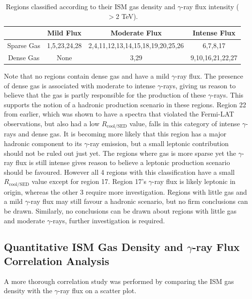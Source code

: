 \documentclass[12pt,a4paper]{article}
\begin{document}
\begin{table}[h] 
	\begin{center}
		\begin{tabular}{c|ccc}
			\toprule
			& Mild Flux  & Moderate Flux & Intense Flux \\
			\hline
			Sparse Gas &1,5,23,24,28&2,4,11,12,13,14,15,18,19,20,25,26&6,7,8,17\\
			Dense Gas & None & 3,29 & 9,10,16,21,22,27 \\
			\bottomrule
		\end{tabular} 
	\end{center}
	\caption{Regions classified according to their ISM gas density and $\gamma$-ray flux intensity ($>$2 TeV).}
	\label{tab:densgamclass}
\end{table}
Note that no regions contain dense gas and have a mild $\gamma$-ray flux. The presence of dense gas is associated with moderate to intense $\gamma$-rays, giving us reason to believe that the gas is partly responsible for the production of these $\gamma$-rays. This supports the notion of a hadronic production scenario in these regions. Region 22 from earlier, which was shown to have a spectra that violated the Fermi-LAT observations, but also had a low $R_{\mathrm{cool/SED}}$ value, falls in this category of intense $\gamma$-rays and dense gas. It is becoming more likely that this region has a major hadronic component to its $\gamma$-ray emission, but a small leptonic contribution should not be ruled out just yet. The regions where gas is more sparse yet the $\gamma$-ray flux is still intense gives reason to believe a leptonic production scenario should be favoured. However all 4 regions with this classification have a small $R_{\mathrm{cool/SED}}$ value except for region 17. Region 17's $\gamma$-ray flux is likely leptonic in origin, whereas the other 3 require more investigation. Regions with little gas and a mild $\gamma$-ray flux may still favour a hadronic scenario, but no firm conclusions can be drawn. Similarly, no conclusions can be drawn about regions with little gas and moderate $\gamma$-rays, further investigation is required. 

\subsection{Quantitative ISM Gas Density and $\gamma$-ray Flux Correlation Analysis} \label{sec:gasgamma}
A more thorough correlation study was performed by comparing the ISM gas density with the $\gamma$-ray flux on a scatter plot. 
\end{document}
